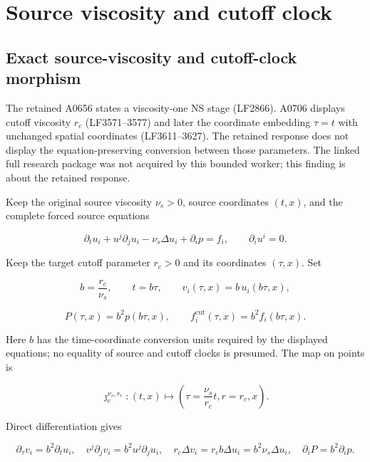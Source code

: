 \documentclass[10pt,a4paper,oneside]{report}
\begin{document}

\endgroup
\clearpage
\chapter{Source viscosity and cutoff clock}
\begingroup
\section{Exact source-viscosity and cutoff-clock
morphism}\label{proof11:exact-source-viscosity-and-cutoff-clock-morphism}

The retained A0656 states a viscosity-one NS stage (LF2866). A0706
displays cutoff viscosity \(r_c\) (LF3571--3577) and later the
coordinate embedding \(\tau=t\) with unchanged spatial coordinates
(LF3611--3627). The retained response does not display the
equation-preserving conversion between those parameters. The linked full
research package was not acquired by this bounded worker; this finding
is about the retained response.

Keep the original source viscosity \(\nu_s>0\), source coordinates
\((t,x)\), and the complete forced source equations

\[
\partial_tu_i+u^j\partial_ju_i-\nu_s\Delta u_i+\partial_ip=f_i,
\qquad \partial_iu^i=0.
\]

Keep the target cutoff parameter \(r_c>0\) and its coordinates
\((\tau,x)\). Set

\[
b=\frac{r_c}{\nu_s},\qquad
t=b\tau,
\qquad v_i(\tau,x)=b\,u_i(b\tau,x),
\]

\[
P(\tau,x)=b^2p(b\tau,x),
\qquad f_i^{\mathrm{cut}}(\tau,x)=b^2f_i(b\tau,x).
\]

Here \(b\) has the time-coordinate conversion units required by the
displayed equations; no equality of source and cutoff clocks is
presumed. The map on points is

\[
\jmath_c^{\nu_s,r_c}:(t,x)\longmapsto
\left(\tau=\frac{\nu_s}{r_c}t,r=r_c,x\right).
\]

Direct differentiation gives

\[
\partial_\tau v_i=b^2\partial_tu_i,
\quad v^j\partial_jv_i=b^2u^j\partial_ju_i,
\quad r_c\Delta v_i=r_cb\Delta u_i=b^2\nu_s\Delta u_i,
\quad \partial_iP=b^2\partial_ip.
\]
\end{document}
